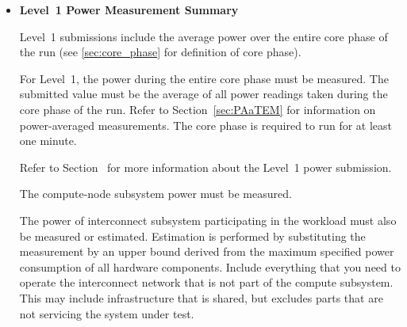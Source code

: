 \begin{itemize}
Note that in some cases, you may have to adjust for power loss.
For information about power loss, refer to Section~.
If you adjust for power loss, how you determined the power losses must be part of the submission.





\item[{[ ]}]
\textbf{Level~1 Power Measurement Summary}

Level~1 submissions include the average power over the entire core phase of the run (see \ref{sec:core_phase} for definition of core phase).

For Level~1, the power during the entire core phase must be measured.
The submitted value must be the average of all power readings taken during the core phase of the run.
Refer to Section~\ref{sec:PAaTEM} for information on power-averaged measurements.
The core phase is required to run for at least one minute.

Refer to Section~ for more information about the Level~1 power submission.

The compute-node subsystem power must be measured.

The power of interconnect subsystem participating in the workload must also be measured or estimated.
Estimation is performed by substituting the measurement by an upper bound derived from the maximum specified power consumption of all hardware components.
Include everything that you need to operate the interconnect network that is not part of the compute subsystem.
This may include infrastructure that is shared, but excludes parts that are not servicing the system under test.


\end{itemize}
